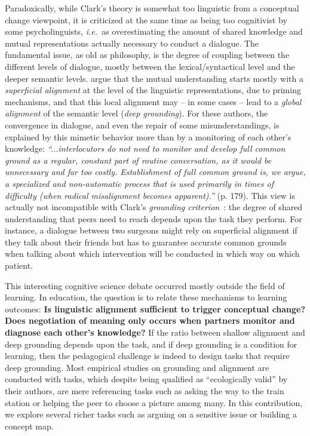 \documentclass[twocolumn]{article}
\newcommand{\ie}{{\textit{i.e.\ }}}
\begin{document}
Paradoxically, while Clark's theory is somewhat too linguistic from a conceptual
change viewpoint, it is criticized at the same time as being too cognitivist by
some psycholinguists, \ie as overestimating the amount of shared knowledge and
mutual representations actually necessary to conduct a dialogue. The fundamental
issue, as old as philosophy, is the degree of coupling between the different
levels of dialogue, mostly between the lexical/syntactical level and the deeper
semantic levels. \citet{pickering2006alignment} argue that the mutual
understanding starts mostly with a \emph{superficial alignment} at the level of
the linguistic representations, due to priming mechanisms, and that this local
alignment may -- in some cases -- lead to a \emph{global alignment} of the
semantic level (\emph{deep grounding}).  For these authors, the convergence in
dialogue, and even the repair of some misunderstandings, is explained by this
mimetic behavior more than by a monitoring of each other's knowledge:
\emph{``...interlocutors do not need to monitor and develop full common ground
as a regular, constant part of routine conversation, as it would be
unnecessary and far too costly. Establishment of full common ground is, we
argue, a specialized and non-automatic process that is used primarily in
times of difficulty (when radical misalignment becomes apparent).''} (p. 179).
This view is actually not incompatible with Clark's \emph{grounding
criterion}~\citep{clark1989contributing}: the degree of shared understanding that
peers need to reach depends upon the task they perform. For instance, a dialogue
between two surgeons might rely on superficial alignment if they talk about
their friends but has to guarantee accurate common grounds when talking about
which intervention will be conducted in which way on which patient. 

This interesting cognitive science debate occurred mostly outside the field of
learning. In education, the question is to relate these mechanisms to learning
outcomes: \textbf{Is linguistic alignment sufficient to trigger conceptual
change?} \textbf{Does negotiation of meaning only occurs when partners monitor
and diagnose each other's knowledge?} If the ratio between shallow alignment and
deep grounding depends upon the task, and if deep grounding is a condition for
learning, then the pedagogical challenge is indeed to design tasks that require
deep grounding. Most empirical studies on grounding and alignment are conducted
with tasks, which despite being qualified as ``ecologically valid'' by their
authors, are mere referencing tasks such as asking the way to the train station
or helping the peer to choose a picture among many. In this contribution, we
explore several richer tasks such as arguing on a sensitive issue or building a
concept map.  
\end{document}
